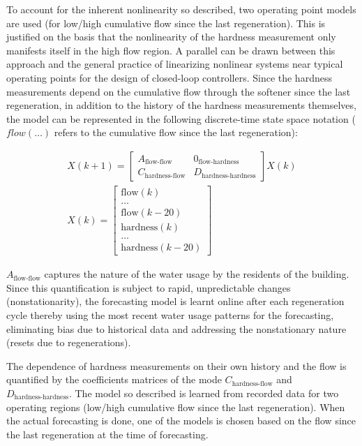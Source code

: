 To account for the inherent nonlinearity so described, two operating point models are used (for low/high cumulative flow since the last regeneration).
 This is justified on the basis that the nonlinearity of the hardness measurement only manifests itself in the high flow region.
 A parallel can be drawn between this approach and the general practice of linearizing nonlinear systems near typical operating points for the design of closed-loop controllers.
 Since the hardness measurements depend on the cumulative flow through the softener since the last regeneration, in addition to the history of the hardness measurements themselves, the model can be represented in the following discrete-time state space notation ($flow(\dots)$ refers to the cumulative flow since the last regeneration):

\begin{gather}
X(k+1) = \begin{bmatrix}
A_{\text{flow-flow}} & 0_{\text{flow-hardness}} \\ 
C_{\text{hardness-flow}} & D_{\text{hardness-hardness}}
\end{bmatrix} X(k) \\
X(k) = \begin{bmatrix}
\text{flow}(k) \\
\dots \\
\text{flow}(k-20) \\
\text{hardness}(k) \\
\dots \\
\text{hardness}(k-20)
\end{bmatrix}
\end{gather}

$A_{\text{flow-flow}}$ captures the nature of the water usage by the residents of the building.
 Since this quantification is subject to rapid, unpredictable changes (nonstationarity), the forecasting model is learnt online after each regeneration cycle thereby using the most recent water usage patterns for the forecasting, eliminating bias due to historical data and addressing the nonstationary nature (resets due to regenerations).
 
 
The dependence of hardness measurements on their own history and the flow is quantified by the coefficients matrices of the mode $C_{\text{hardness-flow}}$ and $D_{\text{hardness-hardness}}$.
 The model so described is learned from recorded data for two operating regions (low/high cumulative flow since the last regeneration).
 When the actual forecasting is done, one of the models is chosen based on the flow since the last regeneration at the time of forecasting.


